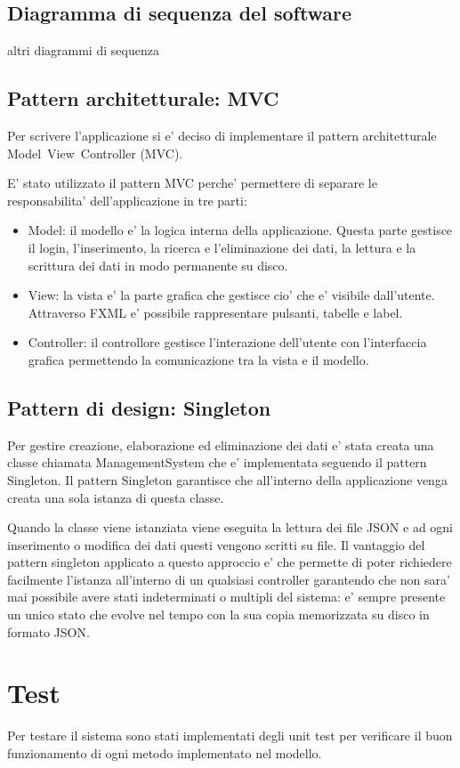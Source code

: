 \documentclass[ 4paper,11pt,openany]{book}
\begin{document}
\section{Diagramma di sequenza del software}
altri diagrammi di sequenza


\section{Pattern architetturale: MVC}
Per scrivere l'applicazione si e' deciso di implementare il pattern architetturale Model~View~Controller (MVC).

E' stato utilizzato il pattern MVC perche' permettere di separare le responsabilita' dell'applicazione in tre parti:
\begin{itemize}
    \item Model: il modello e' la logica interna della applicazione. Questa parte gestisce il login, l'inserimento, la ricerca e l'eliminazione dei dati, la lettura e la scrittura dei dati in modo permanente su disco.
    \item View: la vista e' la parte grafica che gestisce cio' che e' visibile dall'utente. Attraverso FXML e' possibile rappresentare pulsanti, tabelle e label.
    \item Controller: il controllore gestisce l'interazione dell'utente con l'interfaccia grafica permettendo la comunicazione tra la vista e il modello.
\end{itemize}

\section{Pattern di design: Singleton}
Per gestire creazione, elaborazione ed eliminazione dei dati e' stata creata una classe chiamata ManagementSystem che e' implementata seguendo il pattern Singleton.
Il pattern Singleton garantisce che all'interno della applicazione venga creata una sola istanza di questa classe.

Quando la classe viene istanziata viene eseguita la lettura dei file JSON e ad ogni inserimento o modifica dei dati questi vengono scritti su file.
Il vantaggio del pattern singleton applicato a questo approccio e' che permette di poter richiedere facilmente l'istanza all'interno di un qualsiasi controller garantendo che non sara' mai possibile avere stati indeterminati o multipli del sistema: e' sempre presente un unico stato che evolve nel tempo con la sua copia memorizzata su disco in formato JSON.

\chapter{Test}
Per testare il sistema sono stati implementati degli unit test per verificare il buon funzionamento di ogni metodo implementato nel modello.
\end{document}
